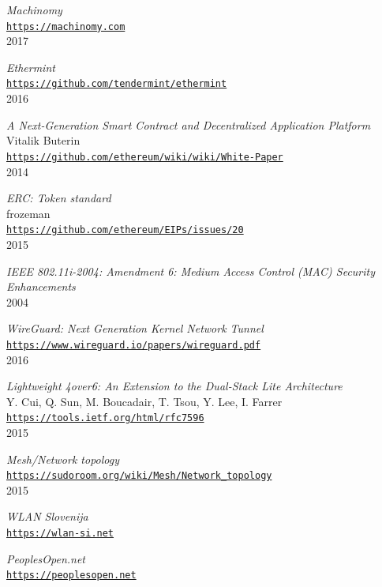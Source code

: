 \documentclass[11pt]{article}
\begin{document}
\begin{thebibliography}{99}
\emph{Machinomy}\\
\texttt{\url{https://machinomy.com}}\\
2017

\emph{Ethermint}\\
\texttt{\url{https://github.com/tendermint/ethermint}}\\
2016

\emph{A Next-Generation Smart Contract and Decentralized Application Platform}\\
Vitalik Buterin\\
\texttt{\url{https://github.com/ethereum/wiki/wiki/White-Paper}}\\
2014

\emph{ERC: Token standard}\\
frozeman\\
\texttt{\url{https://github.com/ethereum/EIPs/issues/20}}\\
2015

\emph{IEEE 802.11i-2004: Amendment 6: Medium Access Control (MAC) Security Enhancements}\\
2004

\emph{WireGuard: Next Generation Kernel Network Tunnel}\\
\texttt{\url{https://www.wireguard.io/papers/wireguard.pdf}}\\
2016

\emph{Lightweight 4over6: An Extension to the Dual-Stack Lite Architecture}\\
Y. Cui, Q. Sun, M. Boucadair, T. Tsou, Y. Lee, I. Farrer\\
\texttt{\url{https://tools.ietf.org/html/rfc7596}}\\
2015

\emph{Mesh/Network topology}\\
\texttt{\url{https://sudoroom.org/wiki/Mesh/Network_topology}}\\
2015

\emph{WLAN Slovenija}\\
\texttt{\url{https://wlan-si.net}}

\emph{PeoplesOpen.net}\\
\texttt{\url{https://peoplesopen.net}}

\end{thebibliography}
\end{document}

